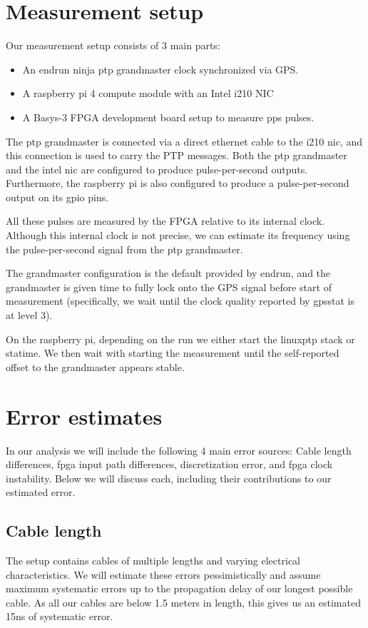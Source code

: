 \documentclass{article}
\begin{document}
\section{Measurement setup}

Our measurement setup consists of 3 main parts:
\begin{itemize}
    \item An endrun ninja ptp grandmaster clock synchronized via GPS.
    \item A raspberry pi 4 compute module with an Intel i210 NIC
    \item A Basys-3 FPGA development board setup to measure pps pulses.
\end{itemize}

The ptp grandmaster is connected via a direct ethernet cable to the i210 nic, and this connection is used to carry the PTP messages. Both the ptp grandmaster and the intel nic are configured to produce pulse-per-second outputs. Furthermore, the raspberry pi is also configured to produce a pulse-per-second output on its gpio pins.

All these pulses are measured by the FPGA relative to its internal clock. Although this internal clock is not precise, we can estimate its frequency using the pulse-per-second signal from the ptp grandmaster.

The grandmaster configuration is the default provided by endrun, and the grandmaster is given time to fully lock onto the GPS signal before start of measurement (specifically, we wait until the clock quality reported by gpsstat is at level 3).

On the raspberry pi, depending on the run we either start the linuxptp stack or statime. We then wait with starting the measurement until the self-reported offset to the grandmaster appears stable.

\section{Error estimates}

In our analysis we will include the following 4 main error sources: Cable length differences, fpga input path differences, discretization error, and fpga clock instability. Below we will discuss each, including their contributions to our estimated error.
\subsection{Cable length}
The setup contains cables of multiple lengths and varying electrical characteristics. We will estimate these errors pessimistically and assume maximum systematic errors up to the propagation delay of our longest possible cable. As all our cables are below 1.5 meters in length, this gives us an estimated 15ns of systematic error.
\end{document}
